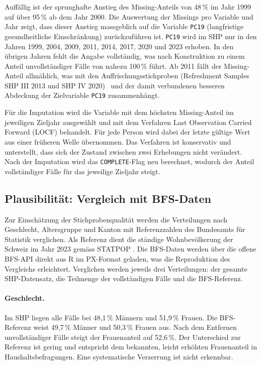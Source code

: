 Auffällig ist der sprunghafte Anstieg des Missing-Anteils von 48\,\% im Jahr 1999 auf
über 95\,\% ab dem Jahr 2000. Die Auswertung der Missings pro Variable und Jahr zeigt,
dass dieser Anstieg massgeblich auf die Variable \texttt{PC19} (langfristige
gesundheitliche Einschränkung) zurückzuführen ist. \texttt{PC19} wird im SHP nur in
den Jahren 1999, 2004, 2009, 2011, 2014, 2017, 2020 und 2023 erhoben. In den übrigen
Jahren fehlt die Angabe vollständig, was nach Konstruktion zu einem Anteil
unvollständiger Fälle von nahezu 100\,\% führt. Ab 2011 fällt der Missing-Anteil
allmählich, was mit den Auffrischungsstichproben (Refreshment Samples SHP III 2013 und
SHP IV 2020)~\cite{Voorpostel2018} und der damit verbundenen besseren Abdeckung der Zielvariable
\texttt{PC19} zusammenhängt.

Für die Imputation wird die Variable mit dem höchsten Missing-Anteil im jeweiligen
Zieljahr ausgewählt und mit dem Verfahren Last Observation Carried Forward (LOCF)
behandelt. Für jede Person wird dabei der letzte gültige Wert aus einer früheren
Welle übernommen. Das Verfahren ist konservativ und unterstellt, dass sich der
Zustand zwischen zwei Erhebungen nicht verändert. Nach der Imputation wird das
\texttt{COMPLETE}-Flag neu berechnet, wodurch der Anteil vollständiger Fälle für das
jeweilige Zieljahr steigt.



\subsection{Plausibilität: Vergleich mit BFS-Daten}
\label{subsec:plausibilitaet}

Zur Einschätzung der Stichprobenqualität werden die Verteilungen nach Geschlecht,
Altersgruppe und Kanton mit Referenzzahlen des Bundesamts für Statistik verglichen.
Als Referenz dient die ständige Wohnbevölkerung der Schweiz im Jahr 2023 gemäss
STATPOP \cite{BFS2023}. Die BFS-Daten werden über die offene BFS-API direkt aus R im
PX-Format geladen, was die Reproduktion des Vergleichs erleichtert. Verglichen werden
jeweils drei Verteilungen: der gesamte SHP-Datensatz, die Teilmenge der vollständigen
Fälle und die BFS-Referenz.

\paragraph{Geschlecht.}
Im SHP liegen alle Fälle bei 48{,}1\,\% Männern und 51{,}9\,\% Frauen. Die BFS-Referenz
weist 49{,}7\,\% Männer und 50{,}3\,\% Frauen aus. Nach dem Entfernen unvollständiger
Fälle steigt der Frauenanteil auf 52{,}6\,\%. Der Unterschied zur Referenz ist gering
und entspricht dem bekannten, leicht erhöhten Frauenanteil in Haushaltsbefragungen.
Eine systematische Verzerrung ist nicht erkennbar.


